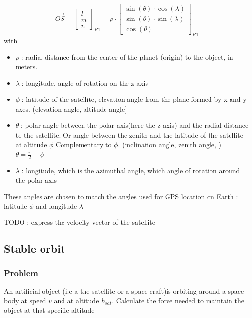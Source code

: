\documentclass[12pt,a4paper]{article}
\begin{document}
\begin{equation}
	\vec{OS} = 	\begin{bmatrix}
		l \\
		m\\
		n
	\end{bmatrix}_{R1} = \rho \cdot
		\begin{bmatrix}
		\sin(\theta) \cdot \cos(\lambda)\\
		\sin(\theta) \cdot \sin(\lambda)\\
		\cos(\theta)
	\end{bmatrix}_{R1}
\end{equation}
with
\begin{itemize}
	\item $\rho$ : radial distance from the center of the planet (origin) to the object, in meters.
	\item $\lambda$ : longitude, angle of rotation on the z axis
	\item $\phi$ : latitude of the satellite, elevation angle from the plane formed by x and y axes. (elevation angle, altitude angle)
	\item $\theta$ : polar angle between the polar axis(here the z axis) and the radial distance to the satellite. Or 	angle between the zenith and the latitude of the satellite at altitude $\phi$
	Complementary to $\phi$. (inclination angle, zenith angle, )
	$\theta = \frac{\pi}{2} - \phi$
	\item $\lambda$ : longitude, which is the azimuthal angle, which angle of rotation around the polar axis
\end{itemize}
 
 These angles are chosen to match the angles used for GPS location on Earth : latitude $\phi$ and longitude $\lambda$

TODO : express the velocity vector of the satellite 

\subsection{Stable orbit}
\subsubsection{Problem}
An artificial object (i.e a the satellite or a space craft)is orbiting around a space body at speed $v$ and at altitude $h_{sat}$. 
Calculate the force needed to maintain the object at that specific altitude
\end{document}
